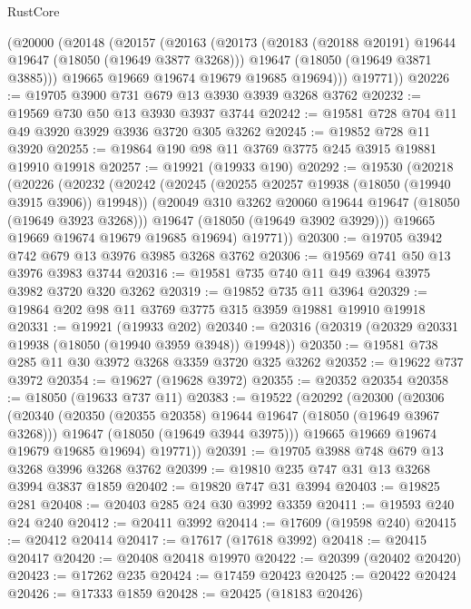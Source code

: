 \begin{lexlean}{RustCore}
\begin{coremodule}
      (@20000
        (@20148
          (@20157
            (@20163
              (@20173
                (@20183 (@20188 @20191) @19644 @19647 (@18050 (@19649 @3877 @3268)))
                @19647
                (@18050 (@19649 @3871 @3885)))
              @19665
              @19669
              @19674
              @19679
              @19685
              @19694)))
        @19771))
@20226 := @19705 @3900 @731 @679 @13 @3930 @3939 @3268 @3762
@20232 := @19569 @730 @50 @13 @3930 @3937 @3744
@20242 := @19581 @728 @704 @11 @49 @3920 @3929 @3936 @3720 @305 @3262
@20245 := @19852 @728 @11 @3920
@20255 := @19864 @190 @98 @11 @3769 @3775 @245 @3915 @19881 @19910 @19918
@20257 := @19921 (@19933 @190)
@20292 := @19530
    (@20218
      (@20226
        (@20232
          (@20242
            (@20245 (@20255 @20257 @19938 (@18050 (@19940 @3915 @3906)) @19948))
            (@20049 @310 @3262 @20060 @19644 @19647 (@18050 (@19649 @3923 @3268)))
            @19647
            (@18050 (@19649 @3902 @3929)))
          @19665
          @19669
          @19674
          @19679
          @19685
          @19694)
        @19771))
@20300 := @19705 @3942 @742 @679 @13 @3976 @3985 @3268 @3762
@20306 := @19569 @741 @50 @13 @3976 @3983 @3744
@20316 := @19581 @735 @740 @11 @49 @3964 @3975 @3982 @3720 @320 @3262
@20319 := @19852 @735 @11 @3964
@20329 := @19864 @202 @98 @11 @3769 @3775 @315 @3959 @19881 @19910 @19918
@20331 := @19921 (@19933 @202)
@20340 := @20316 (@20319 (@20329 @20331 @19938 (@18050 (@19940 @3959 @3948)) @19948))
@20350 := @19581 @738 @285 @11 @30 @3972 @3268 @3359 @3720 @325 @3262
@20352 := @19622 @737 @3972
@20354 := @19627 (@19628 @3972)
@20355 := @20352 @20354
@20358 := @18050 (@19633 @737 @11)
@20383 := @19522
    (@20292
      (@20300
        (@20306
          (@20340
            (@20350 (@20355 @20358) @19644 @19647 (@18050 (@19649 @3967 @3268)))
            @19647
            (@18050 (@19649 @3944 @3975)))
          @19665
          @19669
          @19674
          @19679
          @19685
          @19694)
        @19771))
@20391 := @19705 @3988 @748 @679 @13 @3268 @3996 @3268 @3762
@20399 := @19810 @235 @747 @31 @13 @3268 @3994 @3837 @1859
@20402 := @19820 @747 @31 @3994
@20403 := @19825 @281
@20408 := @20403 @285 @24 @30 @3992 @3359
@20411 := @19593 @240 @24 @240
@20412 := @20411 @3992
@20414 := @17609 (@19598 @240)
@20415 := @20412 @20414
@20417 := @17617 (@17618 @3992)
@20418 := @20415 @20417
@20420 := @20408 @20418 @19970
@20422 := @20399 (@20402 @20420)
@20423 := @17262 @235
@20424 := @17459 @20423
@20425 := @20422 @20424
@20426 := @17333 @1859
@20428 := @20425 (@18183 @20426)

\end{coremodule}
\end{lexlean}

